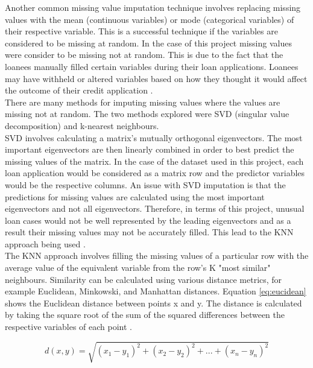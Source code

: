 Another common missing value imputation technique involves replacing missing values with the mean (continuous variables) or mode (categorical variables) of their respective variable. This is a successful technique if the variables are considered to be missing at random. In the case of this project missing values were consider to be missing not at random. This is due to the fact that the loanees manually filled certain variables during their loan applications. Loanees may have withheld or altered variables based on how they thought it would affect the outcome of their credit application \parencite{MissingValuesBos}. \\

There are many methods for imputing missing values where the values are missing not at random. The two methods explored were SVD (singular value decomposition) and k-nearest neighbours. \\

SVD involves calculating a matrix's mutually orthogonal eigenvectors. The most important eigenvectors are then linearly combined in order to best predict the missing values of the matrix. In the case of the dataset used in this project, each loan application would be considered as a matrix row and the predictor variables would be the respective columns. An issue with SVD imputation is that the predictions for missing values are calculated using the most important eigenvectors and not all eigenvectors. Therefore, in terms of this project, unusual loan cases would not be well represented by the leading eigenvectors and as a result their missing values may not be accurately filled. This lead to the KNN approach being used \parencite{MissingValuesStandford}. \\

The KNN approach involves filling the missing values of a particular row with the average value of the equivalent variable from the row's K "most similar" neighbours. Similarity can be calculated using various distance metrics, for example Euclidean, Minkowski, and Manhattan distances. Equation \ref{eq:eucidean} shows the Euclidean distance between points x and y. The distance is calculated by taking the square root of the sum of the squared differences between the respective variables of each point \parencite{EuclideanDist}. 

\vspace{10pt}

\begin{equation} \label{eq:eucidean}
d(x,y)=\sqrt{(x_{1}-y_{1})^{2} + (x_{2}-y_{2})^{2} + ... + (x_{n}-y_{n})^{2}}
\end{equation}

